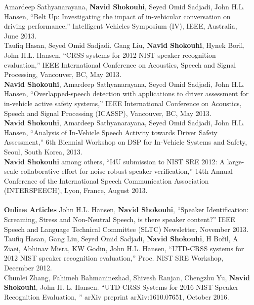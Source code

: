 \documentclass[doublespacing]{utdthesis}
\begin{document}
\begin{vita}
Amardeep Sathyanarayana, {\bf Navid Shokouhi}, Seyed Omid Sadjadi, John H.L. Hansen, ``Belt Up: Investigating the impact of in-vehicular conversation on driving performance,'' Intelligent Vehicles Symposium (IV), IEEE, Australia, June 2013. \\

Taufiq Hasan, Seyed Omid Sadjadi, Gang Liu, {\bf Navid Shokouhi}, Hynek Boril, John H.L. Hansen, ``CRSS systems for 2012 NIST speaker recognition evaluation,'' IEEE International Conference on Acoustics, Speech and Signal Processing, Vancouver, BC, May 2013. \\

{\bf Navid Shokouhi}, Amardeep Sathyanarayana, Seyed Omid Sadjadi, John H.L. Hansen, ``Overlapped-speech detection with applications to driver assessment for in-vehicle active safety systems,'' IEEE International Conference on Acoustics, Speech and Signal Processing (ICASSP), Vancouver, BC, May 2013. \\

{\bf Navid Shokouhi}, Amardeep Sathyanarayana, Seyed Omid Sadjadi, John H.L. Hansen, ``Analysis of In-Vehicle Speech Activity towards Driver Safety Assessment,'' 6th Biennial Workshop on DSP for In-Vehicle Systems and Safety, Seoul, South Korea, 2013.\\

{\bf Navid Shokouhi} among others, ``I4U submission to NIST SRE 2012: A large-scale collaborative effort for noise-robust speaker verification,'' 14th Annual Conference of the International Speech Communication Association (INTERSPEECH), Lyon, France, August 2013.\\\\

\textbf{\sc Online Articles}
John H.L. Hansen, {\bf Navid Shokouhi}, ``Speaker Identification: Screaming, Stress and Non-Neutral Speech, is there speaker content?'' IEEE Speech and Language Technical Committee (SLTC) Newsletter, November 2013.\\

Taufiq Hasan, Gang Liu, Seyed Omid Sadjadi, {\bf Navid Shokouhi}, H Bořil, A Ziaei, Abhinav Misra, KW Godin, John H.L. Hansen, ``UTD-CRSS systems for 2012 NIST speaker recognition evaluation,'' Proc. NIST SRE Workshop, December 2012. \\

Chunlei Zhang, Fahimeh Bahmaninezhad, Shivesh Ranjan, Chengzhu Yu, {\bf Navid Shokouhi}, John H. L. Hansen. ``UTD-CRSS Systems for 2016 NIST Speaker Recognition Evaluation, '' arXiv preprint arXiv:1610.07651, October 2016. 


\end{vita}
\end{document}
